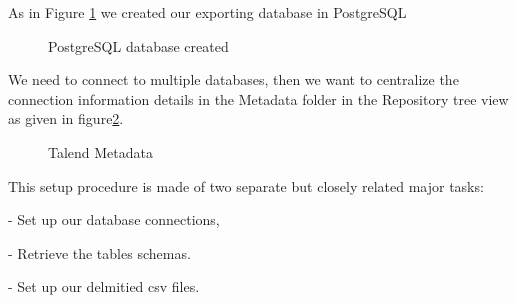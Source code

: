\vskip0.2cm
As in Figure \ref{fig:psqlDB} we created our exporting database in PostgreSQL
\begin{figure}[H]
\centering
{}
\caption{PostgreSQL database created}
\label{fig:psqlDB}
\end{figure}
\vskip0.2cm

We need to connect to multiple databases, then we want to centralize the connection information details in the Metadata folder in the Repository tree view as given in figure\ref{fig:metadata}.
\begin{figure}[H]
\centering
{}
\caption{Talend Metadata}
\label{fig:metadata}
\end{figure}
\vskip0.2cm

This setup procedure is made of two separate but closely related major tasks:
\vskip0.2cm

\quad\quad{}- Set up our database connections,

\quad\quad{}- Retrieve the tables schemas.

\quad\quad{}- Set up our delmitied csv files.

